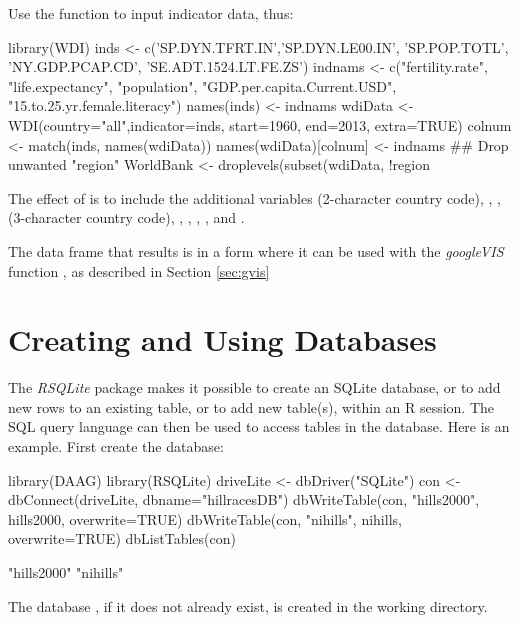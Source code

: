 Use the function  to input indicator data, thus:
\begin{fullwidth}
\begin{Schunk}
\begin{Sinput}
library(WDI)
inds <- c('SP.DYN.TFRT.IN','SP.DYN.LE00.IN', 'SP.POP.TOTL',
 'NY.GDP.PCAP.CD', 'SE.ADT.1524.LT.FE.ZS')
indnams <- c("fertility.rate", "life.expectancy", "population",
             "GDP.per.capita.Current.USD", "15.to.25.yr.female.literacy")
names(inds) <- indnams
wdiData <- WDI(country="all",indicator=inds, start=1960, end=2013, extra=TRUE)
colnum <- match(inds, names(wdiData))
names(wdiData)[colnum] <- indnams
## Drop unwanted "region"
WorldBank <- droplevels(subset(wdiData, !region %in% "Aggregates"))
\end{Sinput}
\end{Schunk}
\end{fullwidth}
The effect of  is to include the additional variables
 (2-character country code), , ,
 (3-character country code), ,
, , ,  and
.

The data frame  that results is in a form where it can
be used with the {\em googleVIS} function ,
as described in Section \ref{sec:gvis}

\section{Creating and Using Databases}\label{ss:dbase}

The \textit{RSQLite} package makes it possible to create an
SQLite database, or to add new rows to an existing table,
or to add new table(s), within an R session. The SQL query
language can then be used to access tables in the database.
Here is an example. First create the database:

\noindent
\begin{Schunk}
\begin{Sinput}
library(DAAG)
library(RSQLite)
driveLite <- dbDriver("SQLite")
con <- dbConnect(driveLite, dbname="hillracesDB")
dbWriteTable(con, "hills2000", hills2000,
             overwrite=TRUE)
dbWriteTable(con, "nihills", nihills,
             overwrite=TRUE)
dbListTables(con)
\end{Sinput}
\begin{Soutput}
[1] "hills2000" "nihills"  
\end{Soutput}
\end{Schunk}
The database , if it does not already exist,
is created in the working directory.

